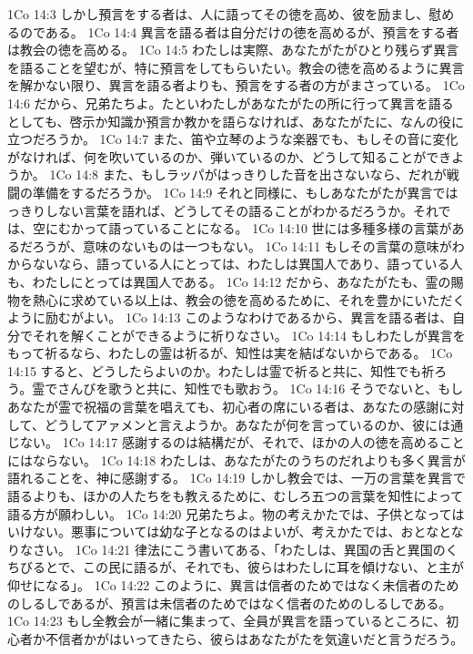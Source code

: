 1Co 14:3  しかし預言をする者は、人に語ってその徳を高め、彼を励まし、慰めるのである。
1Co 14:4  異言を語る者は自分だけの徳を高めるが、預言をする者は教会の徳を高める。
1Co 14:5  わたしは実際、あなたがたがひとり残らず異言を語ることを望むが、特に預言をしてもらいたい。教会の徳を高めるように異言を解かない限り、異言を語る者よりも、預言をする者の方がまさっている。
1Co 14:6  だから、兄弟たちよ。たといわたしがあなたがたの所に行って異言を語るとしても、啓示か知識か預言か教かを語らなければ、あなたがたに、なんの役に立つだろうか。
1Co 14:7  また、笛や立琴のような楽器でも、もしその音に変化がなければ、何を吹いているのか、弾いているのか、どうして知ることができようか。
1Co 14:8  また、もしラッパがはっきりした音を出さないなら、だれが戦闘の準備をするだろうか。
1Co 14:9  それと同様に、もしあなたがたが異言ではっきりしない言葉を語れば、どうしてその語ることがわかるだろうか。それでは、空にむかって語っていることになる。
1Co 14:10  世には多種多様の言葉があるだろうが、意味のないものは一つもない。
1Co 14:11  もしその言葉の意味がわからないなら、語っている人にとっては、わたしは異国人であり、語っている人も、わたしにとっては異国人である。
1Co 14:12  だから、あなたがたも、霊の賜物を熱心に求めている以上は、教会の徳を高めるために、それを豊かにいただくように励むがよい。
1Co 14:13  このようなわけであるから、異言を語る者は、自分でそれを解くことができるように祈りなさい。
1Co 14:14  もしわたしが異言をもって祈るなら、わたしの霊は祈るが、知性は実を結ばないからである。
1Co 14:15  すると、どうしたらよいのか。わたしは霊で祈ると共に、知性でも祈ろう。霊でさんびを歌うと共に、知性でも歌おう。
1Co 14:16  そうでないと、もしあなたが霊で祝福の言葉を唱えても、初心者の席にいる者は、あなたの感謝に対して、どうしてアァメンと言えようか。あなたが何を言っているのか、彼には通じない。
1Co 14:17  感謝するのは結構だが、それで、ほかの人の徳を高めることにはならない。
1Co 14:18  わたしは、あなたがたのうちのだれよりも多く異言が語れることを、神に感謝する。
1Co 14:19  しかし教会では、一万の言葉を異言で語るよりも、ほかの人たちをも教えるために、むしろ五つの言葉を知性によって語る方が願わしい。
1Co 14:20  兄弟たちよ。物の考えかたでは、子供となってはいけない。悪事については幼な子となるのはよいが、考えかたでは、おとなとなりなさい。
1Co 14:21  律法にこう書いてある、「わたしは、異国の舌と異国のくちびるとで、この民に語るが、それでも、彼らはわたしに耳を傾けない、と主が仰せになる」。
1Co 14:22  このように、異言は信者のためではなく未信者のためのしるしであるが、預言は未信者のためではなく信者のためのしるしである。
1Co 14:23  もし全教会が一緒に集まって、全員が異言を語っているところに、初心者か不信者かがはいってきたら、彼らはあなたがたを気違いだと言うだろう。
